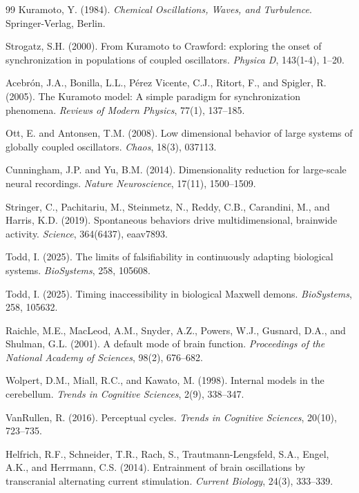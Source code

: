 \documentclass[12pt]{article}
\begin{document}
\begin{thebibliography}{99}
Kuramoto, Y. (1984). \textit{Chemical Oscillations, Waves, and Turbulence}. Springer-Verlag, Berlin.

Strogatz, S.H. (2000). From Kuramoto to Crawford: exploring the onset of synchronization in populations of coupled oscillators. \textit{Physica D}, 143(1-4), 1--20.

Acebr\'{o}n, J.A., Bonilla, L.L., P\'{e}rez Vicente, C.J., Ritort, F., and Spigler, R. (2005). The Kuramoto model: A simple paradigm for synchronization phenomena. \textit{Reviews of Modern Physics}, 77(1), 137--185.

Ott, E. and Antonsen, T.M. (2008). Low dimensional behavior of large systems of globally coupled oscillators. \textit{Chaos}, 18(3), 037113.

Cunningham, J.P. and Yu, B.M. (2014). Dimensionality reduction for large-scale neural recordings. \textit{Nature Neuroscience}, 17(11), 1500--1509.

Stringer, C., Pachitariu, M., Steinmetz, N., Reddy, C.B., Carandini, M., and Harris, K.D. (2019). Spontaneous behaviors drive multidimensional, brainwide activity. \textit{Science}, 364(6437), eaav7893.

Todd, I. (2025). The limits of falsifiability in continuously adapting biological systems. \textit{BioSystems}, 258, 105608.

Todd, I. (2025). Timing inaccessibility in biological Maxwell demons. \textit{BioSystems}, 258, 105632.

Raichle, M.E., MacLeod, A.M., Snyder, A.Z., Powers, W.J., Gusnard, D.A., and Shulman, G.L. (2001). A default mode of brain function. \textit{Proceedings of the National Academy of Sciences}, 98(2), 676--682.

Wolpert, D.M., Miall, R.C., and Kawato, M. (1998). Internal models in the cerebellum. \textit{Trends in Cognitive Sciences}, 2(9), 338--347.

VanRullen, R. (2016). Perceptual cycles. \textit{Trends in Cognitive Sciences}, 20(10), 723--735.

Helfrich, R.F., Schneider, T.R., Rach, S., Trautmann-Lengsfeld, S.A., Engel, A.K., and Herrmann, C.S. (2014). Entrainment of brain oscillations by transcranial alternating current stimulation. \textit{Current Biology}, 24(3), 333--339.


\end{thebibliography}
\end{document}
